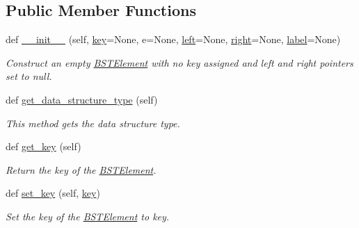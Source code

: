 \subsection*{Public Member Functions}
\begin{DoxyCompactItemize}
\item 
def \mbox{\hyperlink{classbridges_1_1bst__element_1_1_b_s_t_element_ab19a9e72468cca41b601489dc17812a7}{\+\_\+\+\_\+init\+\_\+\+\_\+}} (self, \mbox{\hyperlink{classbridges_1_1bst__element_1_1_b_s_t_element_a8b4c0d8d6a2a7e0fefb013038d26f146}{key}}=None, e=None, \mbox{\hyperlink{classbridges_1_1bin__tree__element_1_1_bin_tree_element_a1e475410000759a092959455957894b6}{left}}=None, \mbox{\hyperlink{classbridges_1_1bin__tree__element_1_1_bin_tree_element_a6cf0c7fefefd5eada106df191e055ff5}{right}}=None, \mbox{\hyperlink{classbridges_1_1element_1_1_element_a97551dbb005cd5d1f13b65461290c6e3}{label}}=None)
\begin{DoxyCompactList}\small\item\em Construct an empty \mbox{\hyperlink{classbridges_1_1bst__element_1_1_b_s_t_element}{B\+S\+T\+Element}} with no key assigned and left and right pointers set to null. \end{DoxyCompactList}\item 
def \mbox{\hyperlink{classbridges_1_1bst__element_1_1_b_s_t_element_ad6763a7381b91e16d9dc927a6f501c81}{get\+\_\+data\+\_\+structure\+\_\+type}} (self)
\begin{DoxyCompactList}\small\item\em This method gets the data structure type. \end{DoxyCompactList}\item 
def \mbox{\hyperlink{classbridges_1_1bst__element_1_1_b_s_t_element_a55d8b35bbb309683c3643325749cbf30}{get\+\_\+key}} (self)
\begin{DoxyCompactList}\small\item\em Return the key of the \mbox{\hyperlink{classbridges_1_1bst__element_1_1_b_s_t_element}{B\+S\+T\+Element}}. \end{DoxyCompactList}\item 
def \mbox{\hyperlink{classbridges_1_1bst__element_1_1_b_s_t_element_a426506dad61594f1a581e599f3944feb}{set\+\_\+key}} (self, \mbox{\hyperlink{classbridges_1_1bst__element_1_1_b_s_t_element_a8b4c0d8d6a2a7e0fefb013038d26f146}{key}})
\begin{DoxyCompactList}\small\item\em Set the key of the \mbox{\hyperlink{classbridges_1_1bst__element_1_1_b_s_t_element}{B\+S\+T\+Element}} to key. \end{DoxyCompactList}\item 

\end{DoxyCompactItemize}
